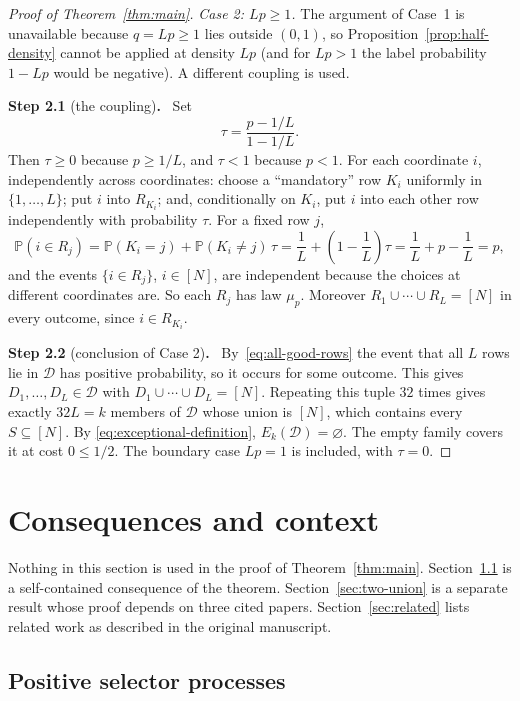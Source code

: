 \documentclass[11pt,letterpaper]{article}
\theoremstyle{definition}
\theoremstyle{remark}
\numberwithin{equation}{section}
\newcommand{\step}[2]{\medskip\noindent\textbf{Step #1} (#2)\textbf{.}\ }
\begin{document}
\begin{proof}[Proof of Theorem~\ref{thm:main}]
\medskip
\noindent\emph{Case 2: $Lp\ge1$.} The argument of Case~1 is unavailable
because $q=Lp\ge1$ lies outside $(0,1)$, so
Proposition~\ref{prop:half-density} cannot be applied at density $Lp$
(and for $Lp>1$ the label probability $1-Lp$ would be negative). A
different coupling is used.

\step{2.1}{the coupling}
Set
\[
\tau=\frac{p-1/L}{1-1/L}.
\]
Then $\tau\ge0$ because $p\ge1/L$, and $\tau<1$ because $p<1$. For each
coordinate $i$, independently across coordinates: choose a ``mandatory''
row $K_i$ uniformly in $\{1,\ldots,L\}$; put $i$ into $R_{K_i}$; and,
conditionally on $K_i$, put $i$ into each other row independently with
probability $\tau$. For a fixed row $j$,
\[
\mathbb P(i\in R_j)
=\mathbb P(K_i=j)+\mathbb P(K_i\ne j)\,\tau
=\frac1L+\left(1-\frac1L\right)\tau=\frac1L+p-\frac1L=p,
\]
and the events $\{i\in R_j\}$, $i\in[N]$, are independent because the
choices at different coordinates are. So each $R_j$ has law $\mu_p$.
Moreover $R_1\cup\cdots\cup R_L=[N]$ in every outcome, since
$i\in R_{K_i}$.

\step{2.2}{conclusion of Case 2}
By~\eqref{eq:all-good-rows} the event that all $L$ rows lie in
$\mathcal D$ has positive probability, so it occurs for some outcome. This
gives $D_1,\ldots,D_L\in\mathcal D$ with $D_1\cup\cdots\cup D_L=[N]$.
Repeating this tuple $32$ times gives exactly $32L=k$ members of
$\mathcal D$ whose union is $[N]$, which contains every $S\subseteq[N]$.
By \eqref{eq:exceptional-definition}, $E_k(\mathcal D)=\varnothing$. The
empty family covers it at cost $0\le1/2$. The boundary case $Lp=1$ is
included, with $\tau=0$.
\end{proof}

\section{Consequences and context}
\label{sec:context}

Nothing in this section is used in the proof of Theorem~\ref{thm:main}.
Section~\ref{sec:selectors} is a self-contained consequence of the
theorem. Section~\ref{sec:two-union} is a separate result whose proof
depends on three cited papers. Section~\ref{sec:related} lists related
work as described in the original manuscript.

\subsection{Positive selector processes}
\label{sec:selectors}
\end{document}
